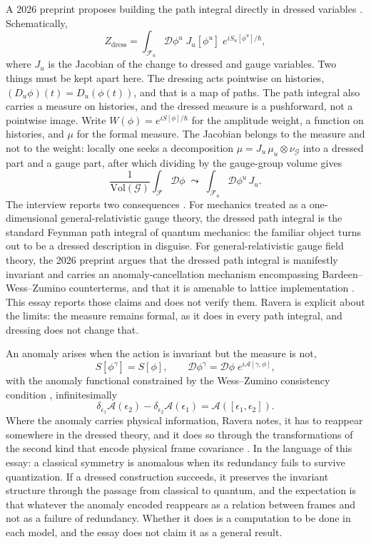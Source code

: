 \documentclass[11pt]{article}
\theoremstyle{plain}
\theoremstyle{definition}
\theoremstyle{remark}
\newcommand{\F}{\mathcal F}
\newcommand{\G}{\mathcal G}
\begin{document}
A 2026 preprint proposes building the path integral directly in dressed variables \cite{fr-pathint}. Schematically,
\begin{equation}\label{eq:Zdress}
Z_{\mathrm{dress}}=\int_{\F_u}\mathcal D\phi^u\;J_u[\phi^u]\;e^{iS_u[\phi^u]/\hbar},
\end{equation}
where $J_u$ is the Jacobian of the change to dressed and gauge variables. Two things must be kept apart here. The dressing acts pointwise on histories, $(D_u\phi)(t)=D_u(\phi(t))$, and that is a map of paths. The path integral also carries a measure on histories, and the dressed measure is a pushforward, not a pointwise image. Write $W(\phi)=e^{iS[\phi]/\hbar}$ for the amplitude weight, a function on histories, and $\mu$ for the formal measure. The Jacobian belongs to the measure and not to the weight: locally one seeks a decomposition $\mu=J_u\,\mu_u\otimes\nu_\G$ into a dressed part and a gauge part, after which dividing by the gauge-group volume gives
\begin{equation}
\frac{1}{\mathrm{Vol}(\G)}\int_\F\mathcal D\phi\;\leadsto\;\int_{\F_u}\mathcal D\phi^u\,J_u .
\end{equation}
The interview reports two consequences \cite{toe}. For mechanics treated as a one-dimensional general-relativistic gauge theory, the dressed path integral is the standard Feynman path integral of quantum mechanics: the familiar object turns out to be a dressed description in disguise. For general-relativistic gauge field theory, the 2026 preprint argues that the dressed path integral is manifestly invariant and carries an anomaly-cancellation mechanism encompassing Bardeen--Wess--Zumino counterterms, and that it is amenable to lattice implementation \cite{fr-pathint}. This essay reports those claims and does not verify them. Ravera is explicit about the limits: the measure remains formal, as it does in every path integral, and dressing does not change that.

An anomaly arises when the action is invariant but the measure is not,
\begin{equation}
S[\phi^\gamma]=S[\phi],\qquad \mathcal D\phi^\gamma=\mathcal D\phi\;e^{i\mathcal A[\gamma,\phi]},
\end{equation}
with the anomaly functional constrained by the Wess--Zumino consistency condition \cite{wess-zumino}, infinitesimally
\begin{equation}
\delta_{\epsilon_1}\mathcal A(\epsilon_2)-\delta_{\epsilon_2}\mathcal A(\epsilon_1)=\mathcal A([\epsilon_1,\epsilon_2]).
\end{equation}
Where the anomaly carries physical information, Ravera notes, it has to reappear somewhere in the dressed theory, and it does so through the transformations of the second kind that encode physical frame covariance \cite{toe}. In the language of this essay: a classical symmetry is anomalous when its redundancy fails to survive quantization. If a dressed construction succeeds, it preserves the invariant structure through the passage from classical to quantum, and the expectation is that whatever the anomaly encoded reappears as a relation between frames and not as a failure of redundancy. Whether it does is a computation to be done in each model, and the essay does not claim it as a general result.
\end{document}

